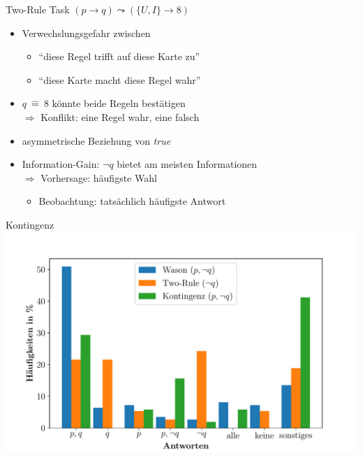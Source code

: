 \begin{frame}{Two-Rule Task {\scriptsize \cite[S.~102-104]{stenningHumanReasoningCognitive2008}}}
    $(p \to q) \leadsto (\{U, I\} \to 8)$

    \begin{itemize}
        \item Verwechslungsgefahr zwischen
        \begin{itemize}
            \item \enquote{diese Regel trifft auf diese Karte zu}
            \item \enquote{diese Karte macht diese Regel wahr}
        \end{itemize}
        
        \item $q~\hat=~8$ könnte beide Regeln bestätigen \\
            $\Rightarrow$ Konflikt: eine Regel wahr, eine falsch
        
        \item asymmetrische Beziehung von \emph{true}
        
        \item Information-Gain: $\lnot q$ bietet am meisten Informationen \\
            $\Rightarrow$ Vorhersage: häufigste Wahl
        \begin{itemize}
            \item Beobachtung: tatsächlich häufigste Antwort
        \end{itemize}
    \end{itemize}
\end{frame}



\begin{frame}{Kontingenz {\scriptsize \cite[S.~109]{stenningHumanReasoningCognitive2008}}}
    \includegraphics[width=\textwidth]{../plot/results_contingency.pdf}
\end{frame}


